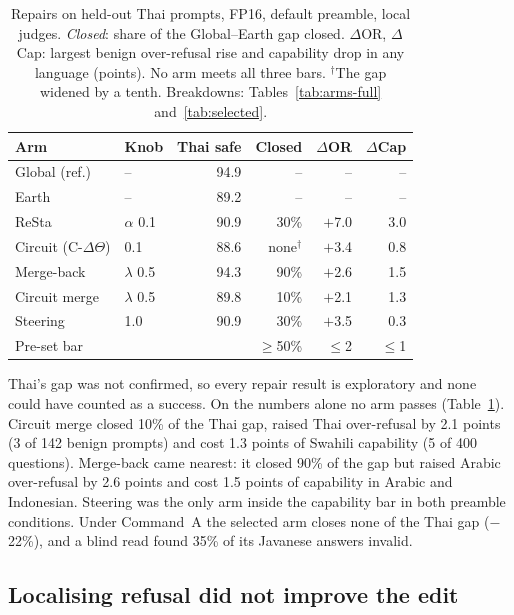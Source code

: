 \documentclass[11pt]{article}
\begin{document}
\begin{table}[t]
\centering\small
\setlength{\tabcolsep}{3.2pt}
\begin{tabular}{llrrrr}
\toprule
Arm & Knob & Thai safe & Closed & $\Delta$OR & $\Delta$Cap \\
\midrule
Global (ref.) & -- & 94.9 & -- & -- & -- \\
Earth & -- & 89.2 & -- & -- & -- \\
\midrule
ReSta & $\alpha$ 0.1 & 90.9 & 30\% & $+$7.0 & 3.0 \\
Circuit (C-$\Delta\Theta$) & 0.1 & 88.6 & none$^\dagger$ & $+$3.4 & 0.8 \\
Merge-back & $\lambda$ 0.5 & 94.3 & 90\% & $+$2.6 & 1.5 \\
Circuit merge & $\lambda$ 0.5 & 89.8 & 10\% & $+$2.1 & 1.3 \\
Steering & 1.0 & 90.9 & 30\% & $+$3.5 & 0.3 \\
\midrule
\multicolumn{3}{l}{Pre-set bar} & $\geq$50\% & $\leq$2 & $\leq$1 \\
\bottomrule
\end{tabular}
\caption{Repairs on held-out Thai prompts, FP16, default preamble, local judges. \emph{Closed}: share of the
Global--Earth gap closed. $\Delta$OR, $\Delta$Cap: largest benign over-refusal rise and capability drop in any
language (points). No arm meets all three bars. $^\dagger$The gap widened by a tenth. Breakdowns: Tables~\ref{tab:arms-full}
and~\ref{tab:selected}.}
\label{tab:repairs}
\end{table}

Thai's gap was not confirmed, so every repair result is exploratory and none could have counted as a success. On the
numbers alone no arm passes (Table~\ref{tab:repairs}). Circuit merge closed 10\% of the Thai gap, raised Thai
over-refusal by 2.1 points (3 of 142 benign prompts) and cost 1.3 points of Swahili capability (5 of 400 questions).
Merge-back came nearest: it closed 90\% of the gap but raised Arabic over-refusal by 2.6 points and cost 1.5 points of
capability in Arabic and Indonesian. Steering was the only arm inside the capability bar in both preamble
conditions. Under Command~A the selected arm closes none of the Thai gap ($-$22\%), and a blind read found 35\% of
its Javanese answers invalid.

\subsection{Localising refusal did not improve the edit}\label{sec:circuits}
\end{document}
